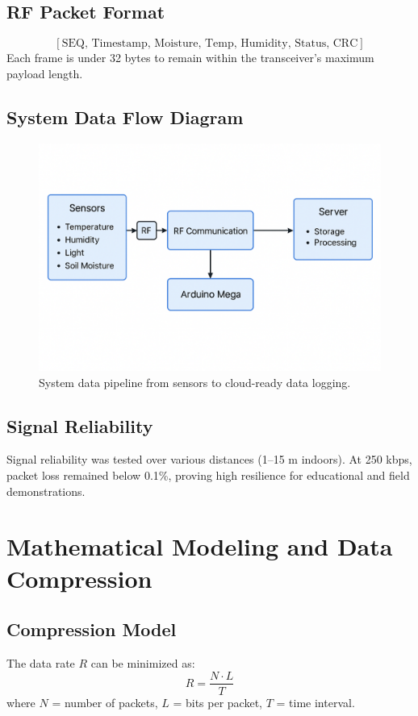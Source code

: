 \documentclass[12pt,a4paper]{article}
\begin{document}
\subsection{RF Packet Format}
\[
[\text{SEQ, Timestamp, Moisture, Temp, Humidity, Status, CRC}]
\]
Each frame is under 32 bytes to remain within the transceiver’s maximum payload length.

\subsection{System Data Flow Diagram}
\begin{figure}[H]\centering
\includegraphics[width=0.9\linewidth]{data_pipeline.png}
\caption{System data pipeline from sensors to cloud-ready data logging.}
\end{figure}

\subsection{Signal Reliability}
Signal reliability was tested over various distances (1–15 m indoors). At 250 kbps, packet loss remained below 0.1\%, proving high resilience for educational and field demonstrations.

\clearpage
\section{Mathematical Modeling and Data Compression}

\subsection{Compression Model}
The data rate \( R \) can be minimized as:
\[
R = \frac{N \cdot L}{T}
\]
where \(N\) = number of packets, \(L\) = bits per packet, \(T\) = time interval. 
\end{document}
